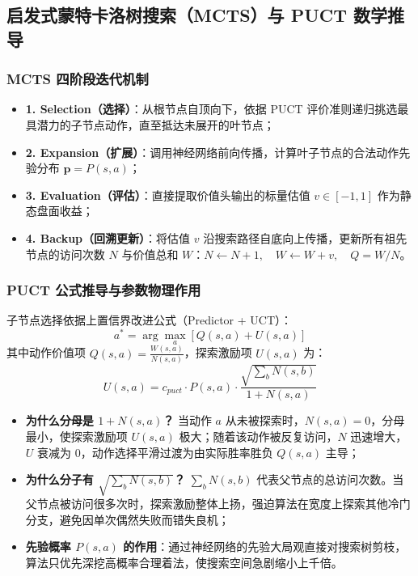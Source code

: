 \documentclass[11pt,a4paper]{ctexart}
\begin{document}
\subsection{启发式蒙特卡洛树搜索（MCTS）与 PUCT 数学推导}

\subsubsection{MCTS 四阶段迭代机制}
\begin{itemize}
  \item \textbf{1. Selection（选择）}：从根节点自顶向下，依据 PUCT 评价准则递归挑选最具潜力的子节点动作，直至抵达未展开的叶节点；
  \item \textbf{2. Expansion（扩展）}：调用神经网络前向传播，计算叶子节点的合法动作先验分布 $\mathbf{p} = P(s, a)$；
  \item \textbf{3. Evaluation（评估）}：直接提取价值头输出的标量估值 $v \in [-1, 1]$ 作为静态盘面收益；
  \item \textbf{4. Backup（回溯更新）}：将估值 $v$ 沿搜索路径自底向上传播，更新所有祖先节点的访问次数 $N$ 与价值总和 $W$：$N \leftarrow N + 1, \quad W \leftarrow W + v, \quad Q = W / N$。
\end{itemize}

\subsubsection{PUCT 公式推导与参数物理作用}
子节点选择依据上置信界改进公式（Predictor + UCT）：
\begin{equation}
a^* = \arg\max_a \left[ Q(s, a) + U(s, a) \right]
\end{equation}
其中动作价值项 $Q(s, a) = \frac{W(s, a)}{N(s, a)}$，探索激励项 $U(s, a)$ 为：
\begin{equation}
U(s, a) = c_{puct} \cdot P(s, a) \cdot \frac{\sqrt{\sum_b N(s, b)}}{1 + N(s, a)}
\end{equation}
\begin{itemize}
  \item \textbf{为什么分母是 $1 + N(s, a)$？} 当动作 $a$ 从未被探索时，$N(s, a) = 0$，分母最小，使探索激励项 $U(s, a)$ 极大；随着该动作被反复访问，$N$ 迅速增大，$U$ 衰减为 0，动作选择平滑过渡为由实际胜率胜负 $Q(s, a)$ 主导；
  \item \textbf{为什么分子有 $\sqrt{\sum_b N(s, b)}$？} $\sum_b N(s, b)$ 代表父节点的总访问次数。当父节点被访问很多次时，探索激励整体上扬，强迫算法在宽度上探索其他冷门分支，避免因单次偶然失败而错失良机；
  \item \textbf{先验概率 $P(s, a)$ 的作用}：通过神经网络的先验大局观直接对搜索树剪枝，算法只优先深挖高概率合理着法，使搜索空间急剧缩小上千倍。
\end{itemize}
\end{document}
